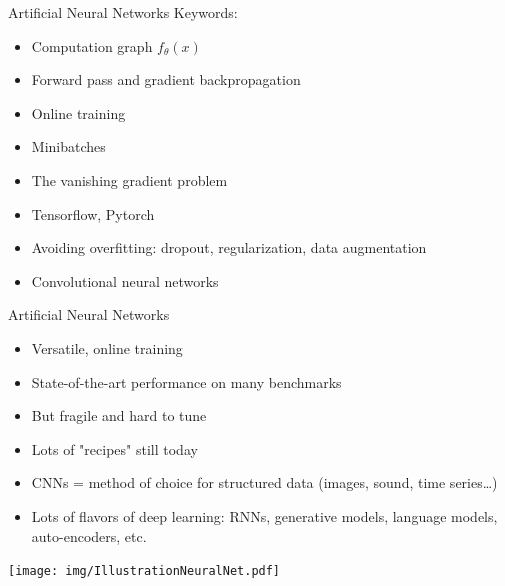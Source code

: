 \documentclass[10pt,a4paper,t,aspectratio=1610,dvipsnames]{beamer}
\begin{document}
\begin{frame}{Artificial Neural Networks}
Keywords:
\begin{itemize}
	\item Computation graph $f_\theta(x)$
	\item Forward pass and gradient backpropagation
	\item Online training
	\item Minibatches
	\item The vanishing gradient problem
	\item Tensorflow, Pytorch
	\item Avoiding overfitting: dropout, regularization, data augmentation
	\item Convolutional neural networks
\end{itemize}
\end{frame}

\begin{frame}{Artificial Neural Networks}
\begin{itemize}
	\item Versatile, online training
	\item State-of-the-art performance on many benchmarks
	\item But fragile and hard to tune
	\item Lots of "recipes" still today
	\item CNNs = method of choice for structured data (images, sound, time series\ldots)
	\item Lots of flavors of deep learning: RNNs, generative models, language models, auto-encoders, etc.
\end{itemize}
\begin{center}
	\texttt{[image: img/IllustrationNeuralNet.pdf]}
\end{center}
\end{frame}
\end{document}
